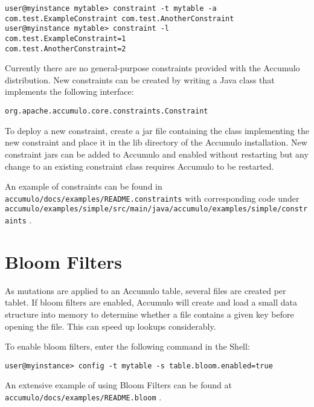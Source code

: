 \begingroup\fontsize{8pt}{8pt}\selectfont\begin{verbatim}
user@myinstance mytable> constraint -t mytable -a com.test.ExampleConstraint com.test.AnotherConstraint
user@myinstance mytable> constraint -l
com.test.ExampleConstraint=1
com.test.AnotherConstraint=2
\end{verbatim}\endgroup

Currently there are no general-purpose constraints provided with the Accumulo
distribution. New constraints can be created by writing a Java class that implements
the following interface:

\begingroup\fontsize{8pt}{8pt}\selectfont\begin{verbatim}
org.apache.accumulo.core.constraints.Constraint
\end{verbatim}\endgroup

To deploy a new constraint, create a jar file containing the class implementing the
new constraint and place it in the lib directory of the Accumulo installation. New
constraint jars can be added to Accumulo and enabled without restarting but any
change to an existing constraint class requires Accumulo to be restarted.

An example of constraints can be found in\\
\texttt{accumulo/docs/examples/README.constraints} with corresponding code under\\
\texttt{accumulo/examples/simple/src/main/java/accumulo/examples/simple/constraints} .

\section{Bloom Filters}
As mutations are applied to an Accumulo table, several files are created per tablet. If
bloom filters are enabled, Accumulo will create and load a small data structure into
memory to determine whether a file contains a given key before opening the file.
This can speed up lookups considerably.

To enable bloom filters, enter the following command in the Shell:

\begingroup\fontsize{8pt}{8pt}\selectfont\begin{verbatim}
user@myinstance> config -t mytable -s table.bloom.enabled=true
\end{verbatim}\endgroup

An extensive example of using Bloom Filters can be found at\\
\texttt{accumulo/docs/examples/README.bloom} .

